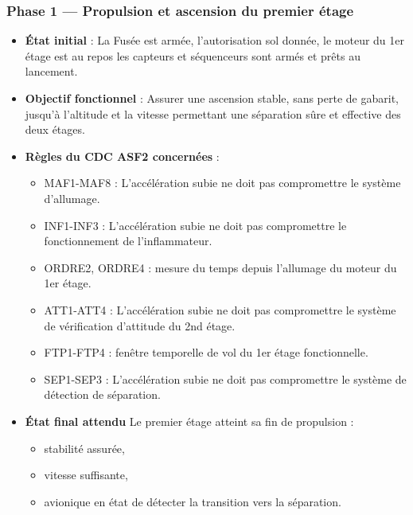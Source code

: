 \subsubsection*{Phase 1 — Propulsion et ascension du premier étage}
\begin{itemize}
    \item \textbf{État initial} : La Fusée est armée, l'autorisation sol donnée, le moteur du 1er étage est au repos les capteurs et
    séquenceurs sont armés et prêts au lancement.
    \item \textbf{Objectif fonctionnel} : Assurer une ascension stable, sans perte de gabarit, jusqu’à l’altitude et la vitesse
    permettant une séparation sûre et effective des deux étages.
    \item \textbf{Règles du \acrshort{CDC} ASF2 concernées} :
    \begin{itemize}
        \item MAF1-MAF8\cite[p. ~68-70]{CDC_BiEtage} : L'accélération subie ne doit pas compromettre le système d'allumage.
        \item INF1-INF3\cite[p. ~73-75]{CDC_BiEtage} : L'accélération subie ne doit pas compromettre le fonctionnement de l'inflammateur.
        \item ORDRE2, ORDRE4\cite[p. ~78-80]{CDC_BiEtage} : mesure du temps depuis l’allumage du moteur du 1er étage.
        \item ATT1-ATT4\cite[p. ~81-83]{CDC_BiEtage} : L'accélération subie ne doit pas compromettre le système de vérification d’attitude du 2nd étage.
        \item FTP1-FTP4\cite[p. ~84-86]{CDC_BiEtage} : fenêtre temporelle de vol du 1er étage fonctionnelle.
        \item SEP1-SEP3\cite[p. ~87-88]{CDC_BiEtage} : L'accélération subie ne doit pas compromettre le système de détection de séparation.
    \end{itemize}
    \item \textbf{État final attendu} Le premier étage atteint sa fin de propulsion :
    \begin{itemize}
        \item stabilité assurée,
        \item vitesse suffisante,
        \item avionique en état de détecter la transition vers la séparation.
    \end{itemize}
\end{itemize}

